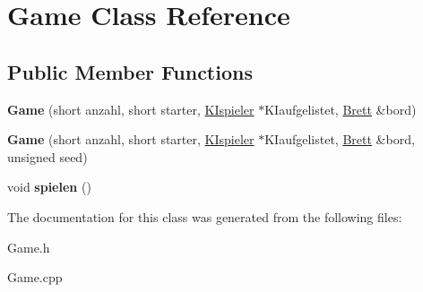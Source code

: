 \hypertarget{class_game}{\section{Game Class Reference}
\label{class_game}
}
\subsection*{Public Member Functions}
\begin{DoxyCompactItemize}
\item 
\hypertarget{class_game_a1692f700e07da238f41f8390f2cb7a94}{{\bfseries Game} (short anzahl, short starter, \hyperlink{class_k_ispieler}{K\-Ispieler} $\ast$K\-Iaufgelistet, \hyperlink{class_brett}{Brett} \&bord)}\label{class_game_a1692f700e07da238f41f8390f2cb7a94}

\item 
\hypertarget{class_game_a1a0594900b3e816eea8252e4655bfd0f}{{\bfseries Game} (short anzahl, short starter, \hyperlink{class_k_ispieler}{K\-Ispieler} $\ast$K\-Iaufgelistet, \hyperlink{class_brett}{Brett} \&bord, unsigned seed)}\label{class_game_a1a0594900b3e816eea8252e4655bfd0f}

\item 
\hypertarget{class_game_a915ba04a272d41f751d736ad3c14b38a}{void {\bfseries spielen} ()}\label{class_game_a915ba04a272d41f751d736ad3c14b38a}

\end{DoxyCompactItemize}


The documentation for this class was generated from the following files\-:\begin{DoxyCompactItemize}
\item 
Game.\-h\item 
Game.\-cpp\end{DoxyCompactItemize}
